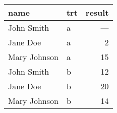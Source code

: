 \begin{tabular}{llr}
  \toprule
 name & trt & result \\ 
  \midrule
  John Smith & a & --- \\ 
  Jane Doe & a &   2 \\ 
  Mary Johnson & a &  15 \\ 
  John Smith & b &  12 \\ 
  Jane Doe & b &  20 \\ 
  Mary Johnson & b &  14 \\ 
   \bottomrule
\end{tabular}
